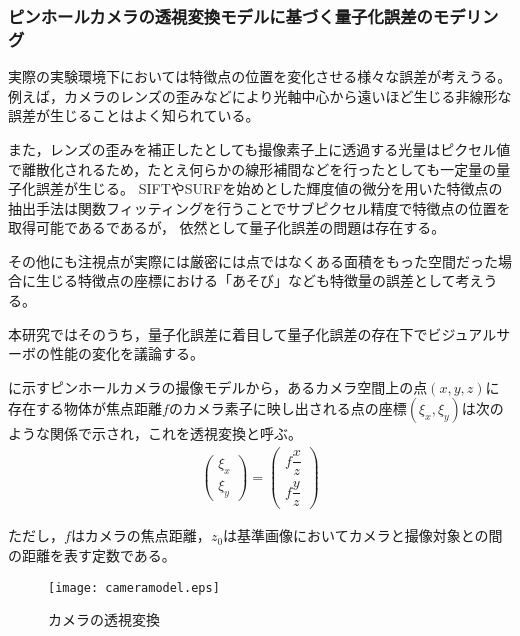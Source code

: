 \documentclass[fleqn]{jreport}
\begin{document}
\subsubsection{ピンホールカメラの透視変換モデルに基づく量子化誤差のモデリング}
実際の実験環境下においては特徴点の位置を変化させる様々な誤差が考えうる。
例えば，カメラのレンズの歪みなどにより光軸中心から遠いほど生じる非線形な誤差が生じることはよく知られている\cite{Corke2011}。

また，レンズの歪みを補正したとしても撮像素子上に透過する光量はピクセル値で離散化されるため，たとえ何らかの線形補間などを行ったとしても一定量の量子化誤差が生じる。
SIFTやSURFを始めとした輝度値の微分を用いた特徴点の抽出手法は関数フィッティングを行うことでサブピクセル精度で特徴点の位置を取得可能である\cite{Lowe2004}であるが，
依然として量子化誤差の問題は存在する。

その他にも注視点が実際には厳密には点ではなくある面積をもった空間だった場合に生じる特徴点の座標における「あそび」なども特徴量の誤差として考えうる。

本研究ではそのうち，量子化誤差に着目して量子化誤差の存在下でビジュアルサーボの性能の変化を議論する。




に示すピンホールカメラの撮像モデルから，あるカメラ空間上の点$(x,y,z)$に存在する物体が焦点距離$f$のカメラ素子に映し出される点の座標$(\xi_x,\xi_y)$は次のような関係で示され，これを透視変換と呼ぶ。
\begin{eqnarray}
	\left(
	\begin{array}{c}
		\xi_x\\
		\xi_y
	\end{array}
	\right)
	=\left(
	\begin{array}{ccc}
		f\dfrac{x}{z}\\[1.5ex]
		f\dfrac{y}{z}
	\end{array}
	\right)
	\label{eq:透視変換}
\end{eqnarray}

ただし，$f$はカメラの焦点距離，$z_0$は基準画像においてカメラと撮像対象との間の距離を表す定数である。

\begin{figure}[t]
	\texttt{[image: cameramodel.eps]}
	\centering
	\caption{カメラの透視変換}
	\label{fig:cameramodel}
\end{figure}
\end{document}
